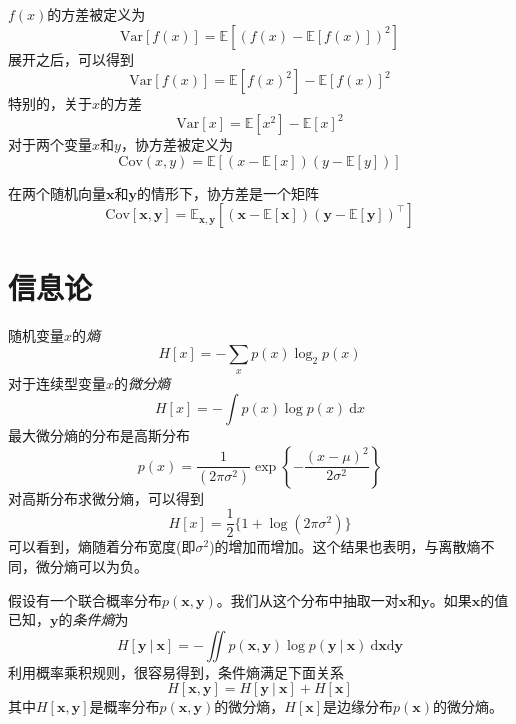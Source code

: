 \documentclass[11pt]{ctexbook}
\begin{document}
$f(x)$的方差被定义为
\begin{equation}
	\mathrm{Var}[f(x)] = \mathbb E[(f(x)-\mathbb E[f(x)])^2]
\end{equation}
展开之后，可以得到
\begin{equation}
	\mathrm{Var}[f(x)] = \mathbb E[f(x)^2] - \mathbb E[f(x)]^2
\end{equation}
特别的，关于$x$的方差
\begin{equation}
	\mathrm{Var}[x] = \mathbb E[x^2] - \mathbb E[x]^2
\end{equation}
对于两个变量$x$和$y$，协方差被定义为
\begin{equation}
	\mathrm{Cov}(x, y) = \mathbb E[(x-\mathbb E[x])(y - \mathbb E[y])]
\end{equation}

在两个随机向量$\bm x$和$\bm y$的情形下，协方差是一个矩阵
\begin{equation}
	\mathrm{Cov}[\bm x, \bm y] = \mathbb E_{\bm x, \bm y}[(\bm x - \mathbb E[\bm x])(\bm y - \mathbb E[\bm y])^\top]
\end{equation}	
\section{信息论}
随机变量$x$的\emph{熵}
\begin{equation}
	H[x] = -\sum_{x}p(x)\log_2p(x)
\end{equation}
对于连续型变量$x$的\emph{微分熵}
\begin{equation}
	H[x] = -\int p(x)\log p(x)\ \mathrm{d}x
\end{equation}
最大微分熵的分布是高斯分布
\begin{equation}
	p(x) = \frac{1}{(2\pi\sigma^2)}\exp\left\{ -\frac{(x-\mu)^2}{2\sigma^2} \right\}
\end{equation}
对高斯分布求微分熵，可以得到
\begin{equation}
	H[x] = \frac{1}{2}\{1+\log(2\pi\sigma^2)\}
\end{equation}
可以看到，熵随着分布宽度(即$\sigma^2$)的增加而增加。这个结果也表明，与离散熵不同，微分熵可以为负。

假设有一个联合概率分布$p(\bm x, \bm y)$。我们从这个分布中抽取一对$\bm x$和$\bm y$。如果$\bm x$的值已知，$\bm y$的\emph{条件熵}为
\begin{equation}
	H[\bm y\ |\ \bm x] = -\iint p(\bm x, \bm y)\log p(\bm y\ |\ \bm x)\ \mathrm{d}\bm x\mathrm{d}\bm y 
\end{equation}
利用概率乘积规则，很容易得到，条件熵满足下面关系
\begin{equation}
	H[\bm x, \bm y] = H[\bm y\ |\ \bm x] + H[\bm x]
\end{equation}
其中$H[\bm x, \bm y]$是概率分布$p(\bm x, \bm y)$的微分熵，$H[\bm x]$是边缘分布$p(\bm x)$的微分熵。
\end{document}
